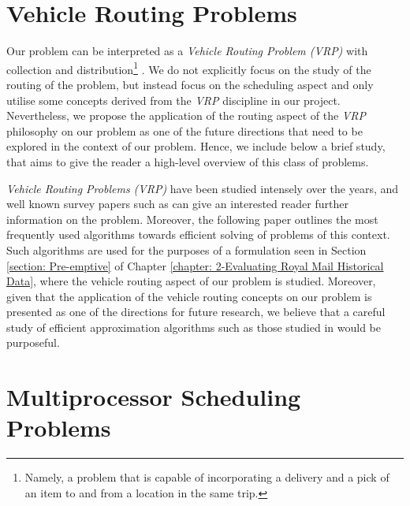 \section{Vehicle Routing Problems}
\label{section: vrp}
Our problem can be interpreted as a \textit{Vehicle Routing Problem (VRP)} with collection and distribution\footnote{Namely, a problem that is capable of incorporating a delivery and a pick of an item to and from a location in the same trip.} \cite{Irnich}. We do not explicitly focus on the study of the routing of the problem, but instead focus on the scheduling aspect and only utilise some concepts derived from the \textit{VRP} discipline in our project. Nevertheless, we propose the application of the routing aspect of the \textit{VRP} philosophy on our problem as one of the future directions that need to be explored in the context of our problem. Hence, we include below a brief study, that aims to give the reader a high-level overview of this class of problems.

\vspace{\baselineskip}
\noindent
\textit{Vehicle Routing Problems (VRP)} have been studied intensely over the years, and well known survey papers such as \cite{doi:surveyVRP} can give an interested reader further information on the problem. Moreover, the following paper \cite{LAPORTE1992345} outlines the most frequently used algorithms towards efficient solving of problems of this context. Such algorithms are used for the purposes of a formulation seen in Section \ref{section: Pre-emptive} of Chapter \ref{chapter: 2-Evaluating Royal Mail Historical Data}, where the vehicle routing aspect of our problem is studied. Moreover, given that the application of the vehicle routing concepts on our problem is presented as one of the directions for future research, we believe that a careful study of efficient approximation algorithms such as those studied in \cite{approx} would be purposeful. 




\section{Multiprocessor Scheduling Problems}

